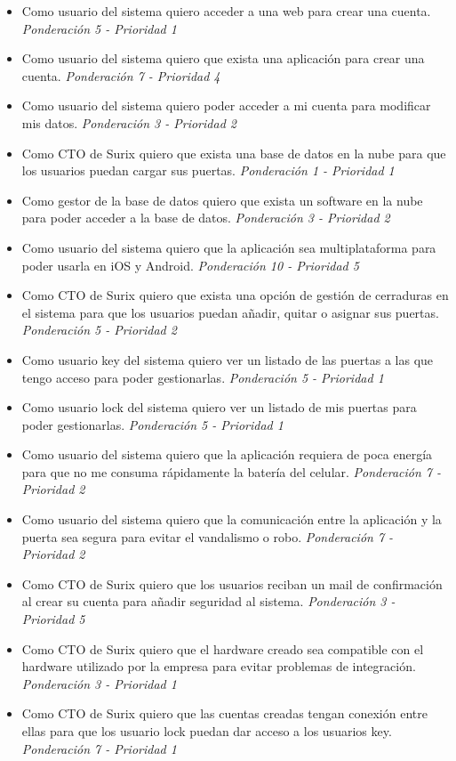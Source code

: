 \documentclass[11pt]{charter}
\begin{document}
\begin{itemize}
\item Como usuario del sistema quiero acceder a una web para crear una cuenta.\textit{ Ponderación 5 - Prioridad 1} 
\item Como usuario del sistema quiero que exista una aplicación para crear una cuenta.\textit{ Ponderación 7 - Prioridad 4}
\item Como usuario del sistema quiero poder acceder a mi cuenta para modificar mis datos.\textit{ Ponderación 3 - Prioridad 2}
\item Como CTO de Surix quiero que exista una base de datos en la nube para que los usuarios puedan cargar sus puertas.\textit{ Ponderación 1 - Prioridad 1}
\item Como gestor de la base de datos quiero que exista un software en la nube para poder acceder a la base de datos.\textit{ Ponderación 3 - Prioridad 2}
\item Como usuario del sistema quiero que la aplicación sea multiplataforma para poder usarla en iOS y Android.\textit{ Ponderación 10 - Prioridad 5}
\item Como CTO de Surix quiero que exista una opción de gestión de cerraduras en el sistema para que los usuarios puedan añadir, quitar o asignar sus puertas.\textit{ Ponderación 5 - Prioridad 2}
\item Como usuario key del sistema quiero ver un listado de las puertas a las que tengo acceso para poder gestionarlas.\textit{ Ponderación 5 - Prioridad 1}
\item Como usuario lock del sistema quiero ver un listado de mis puertas para poder gestionarlas.\textit{ Ponderación 5 - Prioridad 1}
\item Como usuario del sistema quiero que la aplicación requiera de poca energía para que no me consuma rápidamente la batería del celular.\textit{ Ponderación 7 - Prioridad 2}
\item Como usuario del sistema quiero que la comunicación entre la aplicación y la puerta sea segura para evitar el vandalismo o robo.\textit{ Ponderación 7 - Prioridad 2}
\item Como CTO de Surix quiero que los usuarios reciban un mail de confirmación al crear su cuenta para añadir seguridad al sistema.\textit{ Ponderación 3 - Prioridad 5}
\item Como CTO de Surix quiero que el hardware creado sea compatible con el hardware utilizado por la empresa para evitar problemas de integración.\textit{ Ponderación 3 - Prioridad 1}
\item Como CTO de Surix quiero que las cuentas creadas tengan conexión entre ellas para que los usuario lock puedan dar acceso a los usuarios key.\textit{ Ponderación 7 - Prioridad 1}

\end{itemize}
\end{document}
